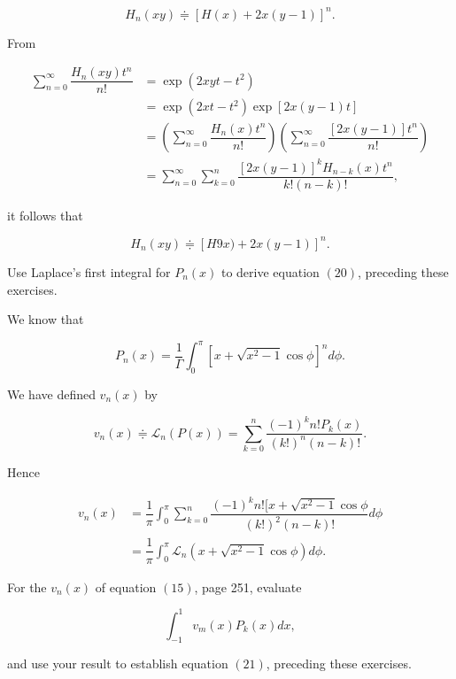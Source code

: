 \begin{problem}\label{problem8chapter15}
$$H_n(xy) \doteqdot [H(x) + 2x(y-1)]^n.$$
\end{problem}
\begin{solution}
From

$$\begin{array}{ll}
\displaystyle\sum_{n=0}^{\infty} \dfrac{H_n(xy)t^n}{n!} &= \exp(2xyt-t^2) \\
&= \exp(2xt-t^2) \exp[2x(y-1)t] \\
&= \left( \displaystyle\sum_{n=0}^{\infty} \dfrac{H_n(x)t^n}{n!} \right) \left( \displaystyle\sum_{n=0}^{\infty} \dfrac{[2x(y-1)]t^n}{n!} \right) \\
&= \displaystyle\sum_{n=0}^{\infty} \displaystyle\sum_{k=0}^n \dfrac{[2x(y-1)]^k H_{n-k}(x) t^n}{k! (n-k)!},
\end{array}$$

it follows that

$$H_n(xy) \doteqdot [H9x) + 2x(y-1)]^n.$$
\end{solution}
\begin{problem}\label{problem9chapter15}
Use Laplace's first integral for $P_n(x)$ to derive equation $(20)$, preceding these exercises.
\end{problem}
\begin{solution}
We know that

$$P_n(x) = \dfrac{1}{\Gamma} \displaystyle\int_0^{\pi} [x+\sqrt{x^2-1}\cos \phi]^n d \phi.$$

We have defined $v_n(x)$ by

$$v_n(x) \doteqdot \mathscr{L}_n \left( P(x) \right) = \displaystyle\sum_{k=0}^n \dfrac{(-1)^k n! P_k(x)}{(k!)^n(n-k)!}.$$

Hence

$$\begin{array}{ll}
v_n(x) &= \dfrac{1}{\pi} \displaystyle\int_0^{\pi} \displaystyle\sum_{k=0}^n \dfrac{(-1)^k n! [x+\sqrt{x^2-1} \cos \phi}{(k!)^2 (n-k)!} d \phi \\
&= \dfrac{1}{\pi} \displaystyle\int_0^{\pi} \mathscr{L}_n \left( x + \sqrt{x^2-1} \cos \phi \right) d \phi.
\end{array}$$
\end{solution}
\begin{problem}\label{problem10chapter15}
For the $v_n(x)$ of equation $(15)$, page 251, evaluate

$$\displaystyle\int_{-1}^1 v_m(x) P_k(x) dx,$$

and use your result to establish equation $(21)$, preceding these exercises.
\end{problem}
